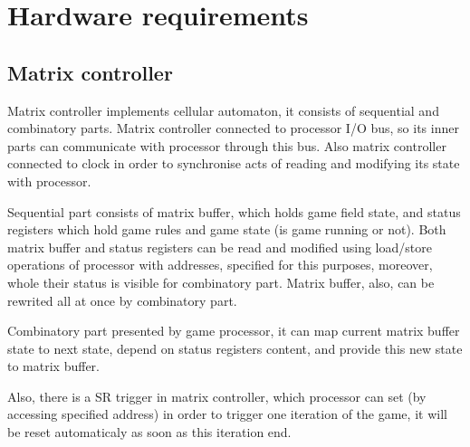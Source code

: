 \chapter*{Hardware requirements}

\section*{Matrix controller}

Matrix controller implements cellular automaton, it consists of sequential and combinatory parts. Matrix controller connected to processor I/O bus, so its inner parts can communicate with processor through this bus. Also matrix controller connected to clock in order to synchronise acts of reading and modifying its state with processor.

Sequential part consists of matrix buffer, which holds game field state, and status registers  which hold game rules and game state (is game running or not). Both matrix buffer and status registers can be read and modified using load/store operations of processor with addresses, specified for this purposes, moreover, whole their status is visible for combinatory part. Matrix buffer, also, can be rewrited all at once by combinatory part.

Combinatory part presented by game processor, it can map current matrix buffer state to next state, depend on status registers content, and provide this new state to matrix buffer.

Also, there is a SR trigger in matrix controller, which processor can set (by accessing specified address) in order to trigger one iteration of the game, it will be reset automaticaly as soon as this iteration end.

